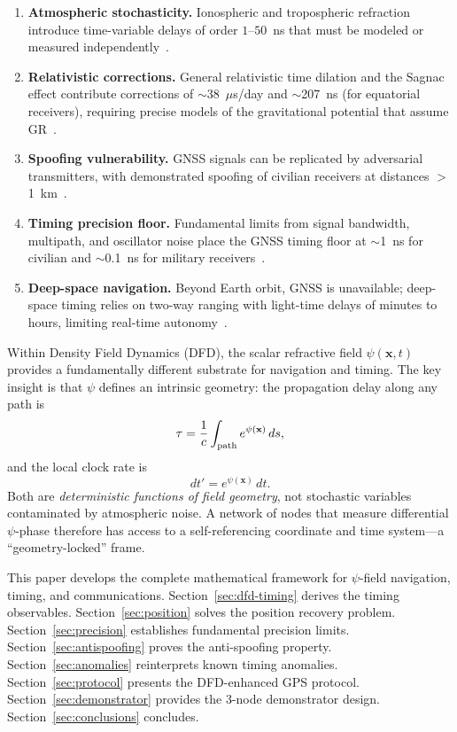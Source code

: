 \documentclass[aps,prd,twocolumn,superscriptaddress,nofootinbib]{revtex4-2}
\begin{document}
\begin{enumerate}
\item \textbf{Atmospheric stochasticity.} Ionospheric and tropospheric
refraction introduce time-variable delays of order $1$--$50$~ns that must
be modeled or measured independently~\cite{Klobuchar1987,Saastamoinen1972}.
\item \textbf{Relativistic corrections.} General relativistic time
dilation and the Sagnac effect contribute corrections of
$\sim$38~$\mu$s/day and $\sim$207~ns (for equatorial receivers),
requiring precise models of the gravitational potential that assume
GR~\cite{Ashby2003}.
\item \textbf{Spoofing vulnerability.} GNSS signals can be replicated
by adversarial transmitters, with demonstrated spoofing of civilian
receivers at distances $>$1~km~\cite{Humphreys2008,Psiaki2016}.
\item \textbf{Timing precision floor.} Fundamental limits from signal
bandwidth, multipath, and oscillator noise place the GNSS timing floor at
$\sim$1~ns for civilian and $\sim$0.1~ns for military
receivers~\cite{Kaplan2017}.
\item \textbf{Deep-space navigation.} Beyond Earth orbit, GNSS is
unavailable; deep-space timing relies on two-way ranging with light-time
delays of minutes to hours, limiting real-time autonomy~\cite{Thornton2003}.
\end{enumerate}

Within Density Field Dynamics (DFD), the scalar refractive field
$\psi(\mathbf{x},t)$ provides a fundamentally different substrate for
navigation and timing. The key insight is that $\psi$ defines an
intrinsic geometry: the propagation delay along any path is
\begin{equation}\label{eq:tau-def}
\tau = \frac{1}{c}\int_{\rm path} e^{\psi(\mathbf{x})}\,ds,
\end{equation}
and the local clock rate is
\begin{equation}\label{eq:dt-prime}
dt' = e^{\psi(\mathbf{x})}\,dt.
\end{equation}
Both are \emph{deterministic functions of field geometry}, not stochastic
variables contaminated by atmospheric noise. A network of nodes that
measure differential $\psi$-phase therefore has access to a
self-referencing coordinate and time system---a ``geometry-locked'' frame.

This paper develops the complete mathematical framework for $\psi$-field
navigation, timing, and communications. Section~\ref{sec:dfd-timing}
derives the timing observables. Section~\ref{sec:position} solves the
position recovery problem. Section~\ref{sec:precision} establishes
fundamental precision limits. Section~\ref{sec:antispoofing} proves the
anti-spoofing property. Section~\ref{sec:anomalies} reinterprets known
timing anomalies. Section~\ref{sec:protocol} presents the DFD-enhanced
GPS protocol. Section~\ref{sec:demonstrator} provides the 3-node
demonstrator design. Section~\ref{sec:conclusions} concludes.
\end{document}
